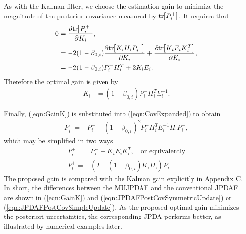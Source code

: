 \documentclass[letterpaper, 10pt, conference]{ieeeconf}
\newcommand{\bracket}[1]{\ensuremath{\left[ #1 \right]}}
\newcommand{\refeqn}[1]{(\ref{eqn:#1})}
\newcommand{\tr}[1]{\mathrm{tr}\ensuremath{\negthickspace\bracket{#1}}}
\begin{document}
As with the Kalman filter, we choose the estimation gain to minimize the magnitude of the posterior covariance measured by $\tr{P_i^+}$.
It requires that
%
\begin{align}
0&=\frac{\partial\tr{P^+_i}}{\partial K_i},\nonumber
\\
&=-2(1-\beta_{0,i})\frac{\partial\tr{K_iH_iP^-_i}}{\partial K_i}+\frac{\partial\tr{K_iE_iK_i^T}}{\partial K_i},\nonumber
\\
&=-2(1-\beta_{0,i})P^-_iH_i^T+2K_iE_i.\label{eqn:Uncertainty0}
\end{align}
Therefore the optimal gain is given by
\begin{align}
K_i&=(1-\beta_{0,i})P^-_iH_i^TE_i^{-1}.\label{eqn:GainK}
\end{align}

Finally, \refeqn{GainK} is substituted into \refeqn{CovExpanded} to obtain
\begin{align}
P^+_{i}=&P^-_{i}-(1-\beta_{0,i})^2P^-_iH_i^TE_i^{-1}H_iP^-_i,
\end{align}
which may be simplified in two ways
\begin{align}
P^+_{i}=&P^-_{i}-K_iE_iK_i^T, \quad \mbox{or equivalently}\label{eqn:JPDAFPostCovSymmetricUpdate}
\\
P^+_{i}=&\left(I-(1-\beta_{0,i})K_iH_i\right)P^-_i.\label{eqn:JPDAFPostCovSimpleUpdate}
\end{align}
The proposed gain is compared with the Kalman gain explicitly in Appendix C.
In short, the differences between the MUJPDAF and the conventional JPDAF are shown in \refeqn{GainK} and \refeqn{JPDAFPostCovSymmetricUpdate} or \refeqn{JPDAFPostCovSimpleUpdate}. As the proposed optimal gain minimizes the posteriori uncertainties, the corresponding JPDA performs better, as illustrated by numerical examples later.
\end{document}
